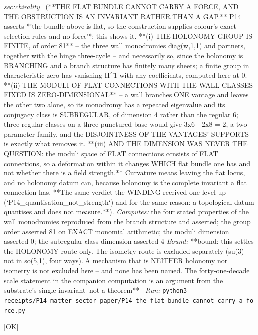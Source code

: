 \begin{description}
\textit{sec:chirality} \ (**THE FLAT BUNDLE CANNOT CARRY A FORCE, AND THE OBSTRUCTION IS AN INVARIANT RATHER THAN A GAP.** P14 asserts *'the bundle above is flat, so the construction supplies colour's exact selection rules and no force'*; this shows it. **(i) THE HOLONOMY GROUP IS FINITE, of order 81** -- the three wall monodromies diag(w,1,1) and partners, together with the hinge three-cycle -- and necessarily so, since the holonomy is BRANCHING and a branch structure has finitely many sheets; a finite group in characteristic zero has vanishing H\textasciicircum{}1 with any coefficients, computed here at 0. **(ii) THE MODULI OF FLAT CONNECTIONS WITH THE WALL CLASSES FIXED IS ZERO-DIMENSIONAL** -- a wall branches ONE vantage and leaves the other two alone, so its monodromy has a repeated eigenvalue and its conjugacy class is SUBREGULAR, of dimension 4 rather than the regular 6; three regular classes on a three-punctured base would give 3x6 - 2x8 = 2, a two-parameter family, and the DISJOINTNESS OF THE VANTAGES' SUPPORTS is exactly what removes it. **(iii) AND THE DIMENSION WAS NEVER THE QUESTION: the moduli space of FLAT connections consists of FLAT connections, so a deformation within it changes WHICH flat bundle one has and not whether there is a field strength.** Curvature means leaving the flat locus, and no holonomy datum can, because holonomy is the complete invariant a flat connection has. **The same verdict the WINDING received one level up (`P14\_quantisation\_not\_strength`) and for the same reason: a topological datum quantises and does not measure.**). 
\emph{Computes:} the four stated properties of the wall monodromies reproduced from the branch structure and asserted; the group order asserted 81 on EXACT monomial arithmetic; the moduli dimension asserted 0; the subregular class dimension asserted 4
 \emph{Bound:} **bound: this settles the HOLONOMY route only. The isometry route is excluded separately (su(3) not in so(5,1), four ways). A mechanism that is NEITHER holonomy nor isometry is not excluded here -- and none has been named. The forty-one-decade scale statement in the companion computation is an argument from the substrate's single invariant, not a theorem**
\ \emph{Run:} \texttt{python3 receipts/P14\_matter\_sector\_paper/P14\_the\_flat\_bundle\_cannot\_carry\_a\_force.py}
\item[\label{rcpt:P15_the_progenitor_vacuum_is_negligible_too}\texttt{P15\_the\_progenitor\_vacuum\_is\_negligible\_too}]\hfill\textsf{[OK]}\\

\end{description}
